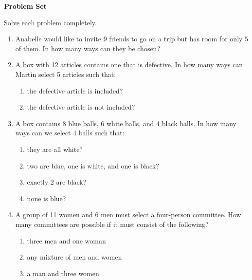 \textbf{Problem Set}

\vspce

Solve each problem completely.
\begin{enumerate}[label = \arabic*. ]
\item Anabelle would like to invite 9 friends to go on a trip but has room for only 5 of them. In how many ways can they be chosen?
\item A box with 12 articles contains one that is defective. In how many ways can Martin
select 5 articles such that: 
\begin{enumerate}[label = \alph*. ]
\item the defective article is included?
\item the defective article is not included?
\end{enumerate}  
\item A box contains 8 blue balls, 6 white balls, and 4 black balls. In how many ways can we select 4 balls such that: 
\begin{enumerate}[label = \alph*. ]
\item they are all white?
\item two are blue, one is white, and one is black?
\item exactly 2 are black?
\item none is blue?
\end{enumerate}  
\item A group of 11 women and 6 men must select a four-person committee. How many committees are possible if it must consist of the following?
\begin{enumerate}[label = \alph*. ]
\item three men and one woman
\item any mixture of men and women
\item a man and three women
\end{enumerate}  

\end{enumerate}   

